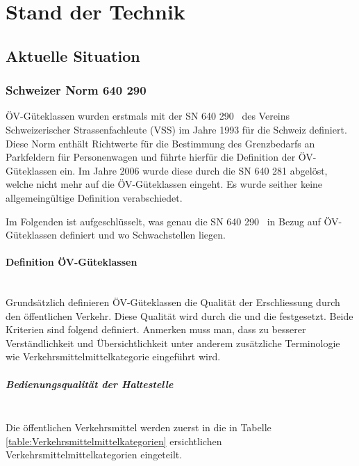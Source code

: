 
\section{Stand der Technik}
\label{Stand der Technik}

\subsection{Aktuelle Situation}
\label{Stand der Technik:Aktuelle Situation}

\subsubsection{Schweizer Norm 640 290}
\label{Aktuelle Situation:Schweizer Norm 640 290}

\acs{ÖV}-Güteklassen wurden erstmals mit der \ac{SN} 640 290~\cite{sn640290} des Vereins Schweizerischer Strassenfachleute (VSS) im Jahre 1993 für die Schweiz definiert.
Diese Norm enthält Richtwerte für die Bestimmung des Grenzbedarfs an Parkfeldern für Personenwagen und führte hierfür die Definition der \acs{ÖV}-Güteklassen ein.
Im Jahre 2006 wurde diese durch die \acs{SN} 640 281 abgelöst, welche nicht mehr auf die \acs{ÖV}-Güteklassen eingeht.
Es wurde seither keine allgemeingültige Definition verabschiedet.

Im Folgenden ist aufgeschlüsselt, was genau die \acs{SN} 640 290~\cite{sn640290} in Bezug auf \acs{ÖV}-Güteklassen definiert und wo Schwachstellen liegen.

\paragraph{Definition ÖV-Güteklassen}~\\
\label{Schweizer Norm 640 290:Definition ÖV-Güteklassen}
Grundsätzlich definieren \acs{ÖV}-Güteklassen die Qualität der Erschliessung durch den öffentlichen Verkehr.
Diese Qualität wird durch die  und die  festgesetzt.
Beide Kriterien sind folgend definiert.
Anmerken muss man, dass zu besserer Verständlichkeit und Übersichtlichkeit unter anderem zusätzliche Terminologie wie Verkehrsmittelmittelkategorie eingeführt wird.

\subparagraph{Bedienungsqualität der Haltestelle}~\\
\label{Definition ÖV-Güteklassen:Bedienungsqualität der Haltestelle}
Die öffentlichen Verkehrsmittel werden zuerst in die in Tabelle \ref{table:Verkehrsmittelmittelkategorien} ersichtlichen Verkehrsmittelmittelkategorien eingeteilt.

